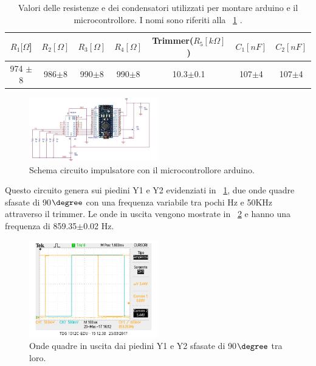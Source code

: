 \documentclass[a4paper,10pt]{article}
\begin{document}
{\begin{table}[H]
	\centering
	\begin{tabular}{c|c|c|c|c|c|c}
	$R_1 [\Omega$] & $R_2 [\Omega]$ & $R_3 [\Omega]$ & $R_4 [\Omega]$ & Trimmer($R_5 [k \Omega]$) & $C_1 [nF]$ & $C_2 [nF]$\\
	\hline
	974 $\pm$8 & 986$\pm$8 & 990$\pm$8& 990$\pm$8 & 10.3$\pm$0.1 & 107$\pm$4 & 107$\pm$4\\
	\hline
	\end{tabular}
	\caption{Valori delle resistenze e dei condensatori utilizzati per montare arduino e il microcontrollore. I nomi sono riferiti alla \figurename{~\ref{fig:schardu}} .}
	\label{tab:ardu}
\end{table}


\begin{figure}[H]
	\centering
	\includegraphics[width=0.5\textwidth]{../grafici/schardu.png}
	\caption{Schema circuito impulsatore con il microcontrollore arduino.}
	\label{fig:schardu}
\end{figure}

Questo circuito genera sui piedini Y1 e Y2 evidenziati in \figurename{~\ref{fig:schardu}}, due onde quadre sfasate di 90$\degree$ con una frequenza variabile tra pochi Hz e 50KHz attraverso il trimmer. Le onde in uscita vengono mostrate in \figurename{~\ref{fig:ardu}} e hanno una frequenza di 859.35$\pm$0.02 Hz.

\begin{figure}[H]
	\centering
	\includegraphics[width=0.5\textwidth]{../grafici/ardu.png}
	\caption{Onde quadre in uscita dai piedini Y1 e Y2 sfasate di 90$\degree$ tra loro.}
	\label{fig:ardu}
\end{figure}


}
\end{document}
